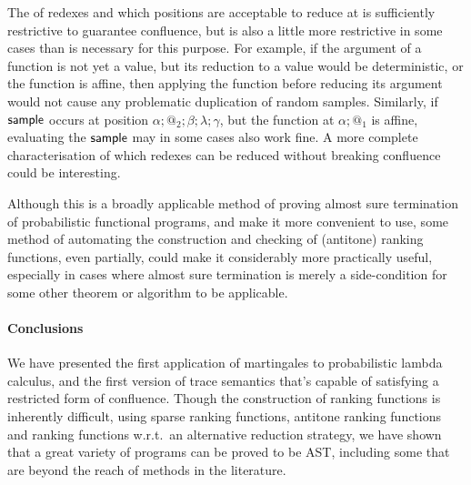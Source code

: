 The  of redexes and which positions are acceptable to reduce at is sufficiently restrictive to guarantee confluence, but is also a little more restrictive in some cases than is necessary for this purpose. For example, if the argument of a function is not yet a value, but its reduction to a value would be deterministic, or the function is affine, then applying the function before reducing its argument would not cause any problematic duplication of random samples. Similarly, if $\mathsf{sample}$ occurs at position $\alpha;@_2;\beta;\lambda;\gamma$, but the function at $\alpha;@_1$ is affine, evaluating the $\mathsf{sample}$ may in some cases also work fine. A more complete characterisation of which redexes can be reduced without breaking confluence could be interesting.

Although this is a broadly applicable method of proving almost sure termination of probabilistic functional programs, and  make it more convenient to use, some method of automating the construction and checking of (antitone) ranking functions, even partially, could make it considerably more practically useful, especially in cases where almost sure termination is merely a side-condition for some other theorem or algorithm to be applicable.

\paragraph*{Conclusions}

We have presented the first application of martingales to probabilistic lambda calculus, and the first version of trace semantics that's capable of satisfying a restricted form of confluence.
Though the construction of ranking functions is inherently difficult, using sparse ranking functions, antitone ranking functions and ranking functions w.r.t.~an alternative reduction strategy, we have shown that a great variety of programs can be proved to be AST, including some that are beyond the reach of methods in the literature.

